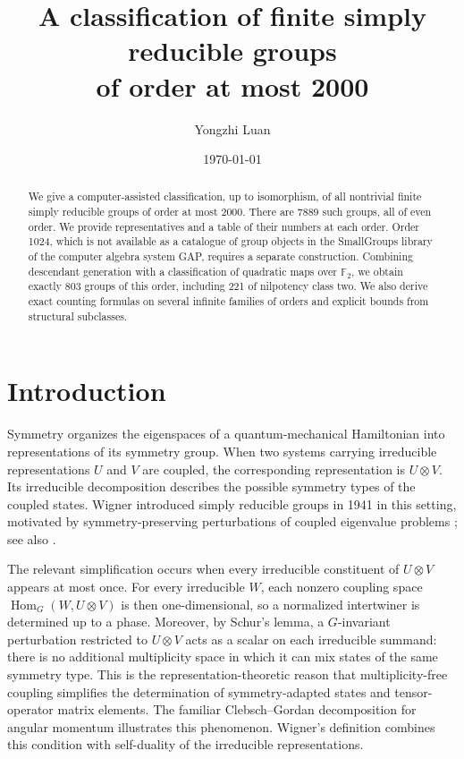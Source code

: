 \documentclass[11pt,a4paper]{amsart}
\title[Classification of simply reducible groups]{A classification of finite simply reducible groups\\of order at most 2000}
\author[Y. Luan]{Yongzhi Luan}
\date{\today}
\theoremstyle{definition}
\theoremstyle{remark}
\DeclareMathOperator{\Hom}{Hom}
\numberwithin{equation}{section}
\begin{document}
\raggedbottom
\begin{abstract}
We give a computer-assisted classification, up to isomorphism, of all
nontrivial finite simply reducible groups of order at most 2000. There
are 7889 such groups, all of even order. We provide representatives
and a table of their numbers at each order. Order 1024, which is not
available as a catalogue of group objects in the SmallGroups library of the computer algebra system GAP,
requires a separate construction. Combining descendant generation
with a classification of quadratic maps over $\mathbb F_2$, we obtain
exactly 803 groups of this order, including 221 of nilpotency class two.
We also derive exact counting formulas on several infinite families
of orders and explicit bounds from structural subclasses.
\end{abstract}
\maketitle
\setcounter{tocdepth}{1}
\tableofcontents
\clearpage

\section{Introduction}
Symmetry organizes the eigenspaces of a quantum-mechanical Hamiltonian
into representations of its symmetry group. When two systems carrying
irreducible representations $U$ and $V$ are coupled, the corresponding
representation is $U\otimes V$. Its irreducible decomposition describes
the possible symmetry types of the coupled states. Wigner introduced
simply reducible groups in 1941 in this setting, motivated by
symmetry-preserving perturbations of coupled eigenvalue problems
\cite{Wig41}; see also \cite[Introduction]{Luan20}.

The relevant simplification occurs when every irreducible constituent
of $U\otimes V$ appears at most once. For every irreducible $W$, each nonzero coupling
space $\Hom_G(W,U\otimes V)$ is then one-dimensional, so a normalized
intertwiner is determined up to a phase. Moreover, by Schur's lemma,
a $G$-invariant perturbation restricted to $U\otimes V$ acts as a scalar
on each irreducible summand: there is no additional multiplicity space
in which it can mix states of the same symmetry type. This is the
representation-theoretic reason that multiplicity-free coupling
simplifies the determination of symmetry-adapted states and tensor-operator
matrix elements. The familiar Clebsch--Gordan decomposition for angular
momentum illustrates this phenomenon. Wigner's definition combines
this condition with self-duality of the irreducible representations.
\end{document}
